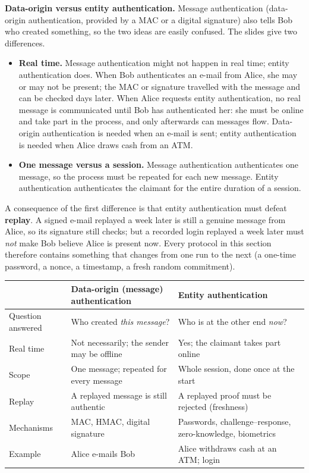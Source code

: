 \textbf{Data-origin versus entity authentication.} Message authentication (data-origin authentication, provided by a MAC or a digital signature) also tells Bob who created something, so the two ideas are easily confused. The slides give two differences.
\begin{itemize}
  \item \textbf{Real time.} Message authentication might not happen in real time; entity authentication does. When Bob authenticates an e-mail from Alice, she may or may not be present; the MAC or signature travelled with the message and can be checked days later. When Alice requests entity authentication, no real message is communicated until Bob has authenticated her: she must be online and take part in the process, and only afterwards can messages flow. Data-origin authentication is needed when an e-mail is sent; entity authentication is needed when Alice draws cash from an ATM.
  \item \textbf{One message versus a session.} Message authentication authenticates one message, so the process must be repeated for each new message. Entity authentication authenticates the claimant for the entire duration of a session.
\end{itemize}
A consequence of the first difference is that entity authentication must defeat \textbf{replay}. A signed e-mail replayed a week later is still a genuine message from Alice, so its signature still checks; but a recorded login replayed a week later must \emph{not} make Bob believe Alice is present now. Every protocol in this section therefore contains something that changes from one run to the next (a one-time password, a nonce, a timestamp, a fresh random commitment).
\begin{center}\small
\begin{tabularx}{\textwidth}{@{}l X X@{}}
\toprule
 & Data-origin (message) authentication & Entity authentication\\
\midrule
Question answered & Who created \emph{this message}? & Who is at the other end \emph{now}?\\
Real time & Not necessarily; the sender may be offline & Yes; the claimant takes part online\\
Scope & One message; repeated for every message & Whole session, done once at the start\\
Replay & A replayed message is still authentic & A replayed proof must be rejected (freshness)\\
Mechanisms & MAC, HMAC, digital signature & Passwords, challenge--response, zero-knowledge, biometrics\\
Example & Alice e-mails Bob & Alice withdraws cash at an ATM; login\\
\bottomrule
\end{tabularx}
\end{center}

